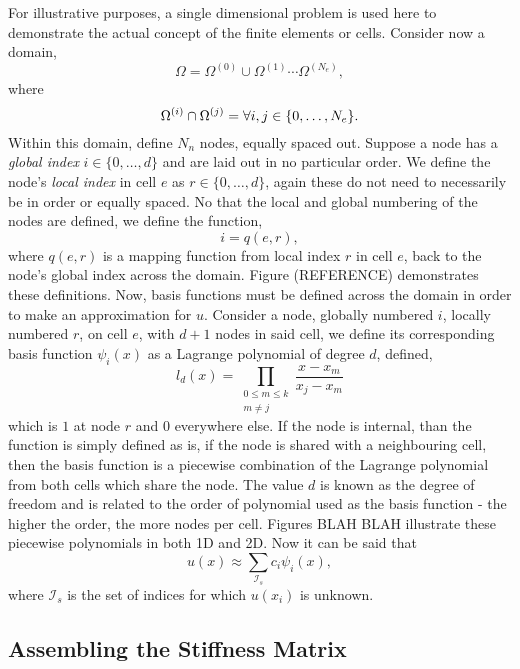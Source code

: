 For illustrative purposes, a single dimensional problem is used here to demonstrate the actual concept of the finite elements or cells. Consider now a domain,
\begin{equation}
	\Omega = \Omega^{(0)}\cup\Omega^{(1)}\cdots\Omega^{(N_e)},
\end{equation}
where 
\begin{equation}
	\Omega^{(i)}\cap\Omega^{(j)} = \null \forall i,j \in \{0,\dots,N_e\}.
\end{equation}
Within this domain, define $N_n$ nodes, equally spaced out. Suppose a node has a \textit{global index} $i \in \{0,\dots,d\}$ and are laid out in no particular order. We define the node's \textit{local index} in cell $e$ as $r \in \{0,\dots,d\}$, again these do not need to necessarily be in order or equally spaced. No that the local and global numbering of the nodes are defined, we define the function,
\begin{equation}
	i = q(e,r),
\end{equation}
where $q(e,r)$ is a mapping function from local index $r$ in cell $e$, back to the node's global index across the domain. Figure (REFERENCE) demonstrates these definitions. Now, basis functions must be defined across the domain in order to make an approximation for $u$. Consider a node, globally numbered $i$, locally numbered $r$, on cell $e$, with $d+1$ nodes in said cell, we define its corresponding basis function $\psi_i(x)$ as a Lagrange polynomial of degree $d$, defined,
\begin{equation}
	l_d(x) = \prod_{\substack{0\leq m\leq k \\ m\neq j}}\frac{x-x_m}{x_j-x_m} 
\end{equation}
which is $1$ at node $r$ and $0$ everywhere else. If the node is internal, than the function is simply defined as is, if the node is shared with a neighbouring cell, then the basis function is a piecewise combination of the Lagrange polynomial from both cells which share the node. The value $d$ is known as the degree of freedom and is related to the order of polynomial used as the basis function - the higher the order, the more nodes per cell. Figures BLAH BLAH illustrate these piecewise polynomials in both 1D and 2D. Now it can be said that
\begin{equation}
	u(x) \approx \sum_{\mathcal{I}_s} c_i \psi_i(x),
\end{equation}
where $\mathcal{I}_s$ is the set of indices for which $u(x_i)$ is unknown.

\subsection{Assembling the Stiffness Matrix}

